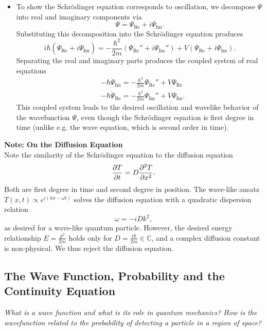 \documentclass[11pt, a4paper]{article}
\newcommand{\Schro}{Schr\"{o}dinger\xspace}
\renewcommand{\P}{\Psi}  %
\begin{document}
\begin{itemize}
    \item To show the \Schro equation corresponds to oscillation, we decompose $ \Psi $ into real and imaginary components via
    \begin{equation*}
        \P = \P_{\text{Re}} + i \P_{\text{Im}}.
    \end{equation*}
    Substituting this decomposition into the \Schro equation produces
    \begin{equation*}
        i \hbar (\dot{\P}_{\text{Re}} + i \dot{\P}_{\text{Im}})  = - \frac{\hbar^{2}}{2m} (\P_{\text{Re}}'' + i \P_{\text{Im}}'') + V(\P_{\text{Re}} + i \P_{\text{Im}}).
    \end{equation*}
    Separating the real and imaginary parts produces the coupled system of real equations
    \begin{align*}
        &- \hbar \dot{\P}_{\text{Im}} = - \frac{\hbar^{2}}{2m}\Psi_{\text{Re}}'' + V \P_{\text{Re}}\\
        & - \hbar \dot{\P}_{\text{Re}} = - \frac{\hbar^{2}}{2m}\Psi_{\text{Im}}'' + V \P_{\text{Im}}.
    \end{align*}
    This coupled system leads to the desired oscillation and wavelike behavior of the wavefunction $ \P $, even though the \Schro equation is first degree in time (unlike e.g. the wave equation, which is second order in time).
\end{itemize}


\vspace{2mm}
\textbf{Note: On the Diffusion Equation}\\
Note the similarity of the \Schro equation to the diffusion equation
\begin{equation*}
	\pdv{T}{t} = D \pdv[2]{T}{x}.
\end{equation*}
Both are first degree in time and second degree in position. The wave-like ansatz $ T(x, t) \propto e^{i(kx - \omega t)} $ solves the diffusion equation with a quadratic dispersion relation
\begin{equation*}
	\omega = -iDk^{2},
\end{equation*}
as desired for a wave-like quantum particle. However, the desired energy relationship $ E = \frac{p^{2}}{2m} $ holds only for $ D = \frac{i\hbar}{2m} \in \mathbb{C} $, and a complex diffusion constant is non-physical. We thus reject the diffusion equation.


\subsection{The Wave Function, Probability and the Continuity Equation}
\textit{What is a wave function and what is its role in quantum mechanics? How is the wavefunction related to the probability of detecting a particle in a region of space?} 
\end{document}
